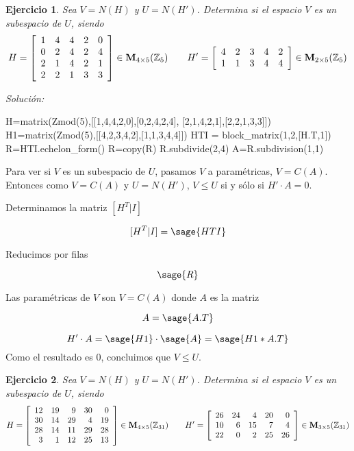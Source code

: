 \documentclass{amsart}
\newtheorem{ejer}{Ejercicio}
\begin{document}
\begin{ejer} Sea $V = N(H)$ y $U = N(H')$. Determina si el espacio $V$ es un subespacio de $U$, siendo 
\[H = \left[\begin{array}{rrrrr}
1 & 4 & 4 & 2 & 0 \\
0 & 2 & 4 & 2 & 4 \\
2 & 1 & 4 & 2 & 1 \\
2 & 2 & 1 & 3 & 3
\end{array}\right] \in {\bf M}_{4 \times 5}({\mathbb Z}_{5}) \qquad
H' = \left[\begin{array}{rrrrr}
4 & 2 & 3 & 4 & 2 \\
1 & 1 & 3 & 4 & 4 
\end{array}\right] \in {\bf M}_{2 \times 5}({\mathbb Z}_{5}) \]
\end{ejer}

{\it Soluci\'on:}
\begin{sageblock}
H=matrix(Zmod(5),[[1,4,4,2,0],[0,2,4,2,4],
[2,1,4,2,1],[2,2,1,3,3]])
H1=matrix(Zmod(5),[[4,2,3,4,2],[1,1,3,4,4]])
HTI = block_matrix(1,2,[H.T,1])
R=HTI.echelon_form()
R=copy(R)
R.subdivide(2,4)
A=R.subdivision(1,1)
\end{sageblock}

Para ver si $V$ es un subespacio de $U$, pasamos $V$ a paramétricas, $V=C(A)$. 
Entonces como $V=C(A)$ y $U=N(H')$, $V\leq U$ si y sólo si $H'\cdot A = 0$.

Determinamos la matriz $[H^T|I]$

$$ [H^T|I] =  \sage{HTI} $$

Reducimos por filas

$$ \sage{R} $$

Las paramétricas de $V$ son $V = C(A)$ donde $A$ es la matriz

$$ A = \sage{A.T} $$


$$ H'\cdot A = \sage{H1}\cdot \sage{A} = \sage{H1*A.T} $$ Como el resultado es $0$, concluimos que $V\leq U$.



\begin{ejer} Sea $V = N(H)$ y $U = N(H')$. Determina si el espacio $V$ es un subespacio de $U$, siendo 
\[H = \left[\begin{array}{rrrrr}
12 & 19 & 9 & 30 & 0 \\
30 & 14 & 29 & 4 & 19 \\
28 & 14 & 11 & 29 & 28 \\
3 & 1 & 12 & 25 & 13
\end{array}\right] \in {\bf M}_{4 \times 5}({\mathbb Z}_{31}) \qquad
H' = \left[\begin{array}{rrrrr}
26 & 24 & 4 & 20 & 0 \\
10 & 6 & 15 & 7 & 4 \\
22 & 0 & 2 & 25 & 26
\end{array}\right] \in {\bf M}_{3 \times 5}({\mathbb Z}_{31}) \]
\end{ejer}
\end{document}
